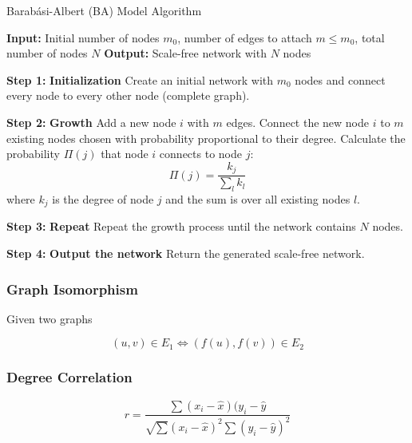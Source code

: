\begin{algorithm}
\caption{Barabási-Albert (BA) Model Algorithm}\label{alg:BA}
\begin{algorithmic}[1]
\State \textbf{Input:} Initial number of nodes $m_0$, number of edges to attach $m \leq m_0$, total number of nodes $N$
\State \textbf{Output:} Scale-free network with $N$ nodes
\State

\State \textbf{Step 1:} \textbf{Initialization}
\State Create an initial network with $m_0$ nodes and connect every node to every other node (complete graph).

\State \textbf{Step 2:} \textbf{Growth}
    \State Add a new node $i$ with $m$ edges.
    \State Connect the new node $i$ to $m$ existing nodes chosen with probability proportional to their degree.
        \State Calculate the probability $\Pi(j)$ that node $i$ connects to node $j$:
        \[
        \Pi(j) = \frac{k_j}{\sum_{l} k_l}
        \]
        where $k_j$ is the degree of node $j$ and the sum is over all existing nodes $l$.
    \EndFor
\EndFor

\State \textbf{Step 3:} \textbf{Repeat}
\State Repeat the growth process until the network contains $N$ nodes.

\State \textbf{Step 4:} \textbf{Output the network}
\State Return the generated scale-free network.
\end{algorithmic}
\end{algorithm}


\subsubsection{Graph Isomorphism}
Given two graphs 

\begin{equation}
    (u,v) \in E_1 \Leftrightarrow (f(u),f(v)) \in E_2
\end{equation}

\subsubsection{Degree Correlation}

\begin{equation}
    r = \frac{\sum(x_i - \hat{x})(y_i-\hat{y}}{\sqrt{\sum}(x_i-\hat{x})^2\sum(y_i-\hat{y})^2}
\end{equation}



